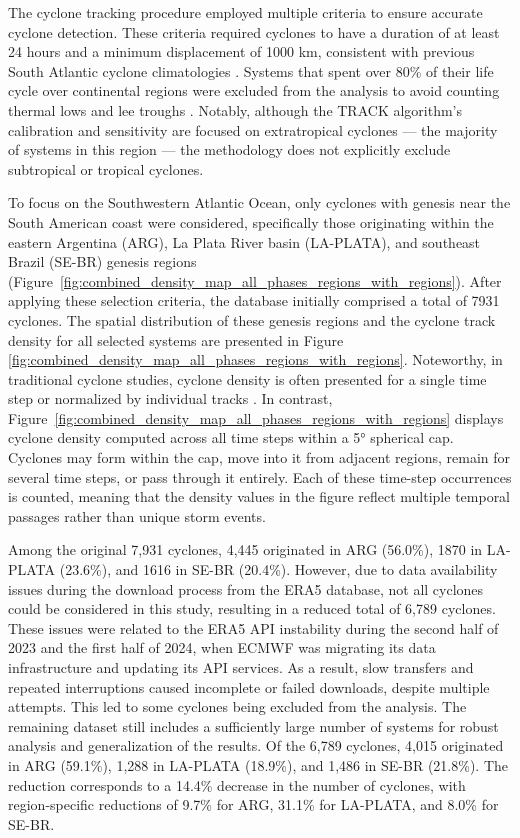 \documentclass[pdflatex,sn-chicago]{sn-jnl}%
\theoremstyle{plain}
\theoremstyle{definition}
\theoremstyle{remark}
\theoremstyle{definition}
\begin{document}
The cyclone tracking procedure employed multiple criteria to ensure accurate cyclone detection. These criteria required cyclones to have a duration of at least 24 hours and a minimum displacement of 1000 km, consistent with previous South Atlantic cyclone climatologies \citep{sinclair1995climatology,gramcianinov2019properties}. Systems that spent over 80\% of their life cycle over continental regions were excluded from the analysis to avoid counting thermal lows and lee troughs \citep[e.g.][]{crespo2021potential}. Notably, although the TRACK algorithm's calibration and sensitivity are focused on extratropical cyclones — the majority of systems in this region \citep{marrafon2022classificaccao} — the methodology does not explicitly exclude subtropical or tropical cyclones.  

To focus on the Southwestern Atlantic Ocean, only cyclones with genesis near the South American coast were considered, specifically those originating within the eastern Argentina (ARG), La Plata River basin (LA-PLATA), and southeast Brazil (SE-BR) genesis regions \citep{gramcianinov2019properties,couto2024new} (Figure~\ref{fig:combined_density_map_all_phases_regions_with_regions}). After applying these selection criteria, the database initially comprised a total of 7931 cyclones. The spatial distribution of these genesis regions and the cyclone track density for all selected systems are presented in Figure \ref{fig:combined_density_map_all_phases_regions_with_regions}. Noteworthy, in traditional cyclone studies, cyclone density is often presented for a single time step or normalized by individual tracks \citep[e.g.,][]{hoskins2005new,gramcianinov2019properties}. In contrast, Figure~\ref{fig:combined_density_map_all_phases_regions_with_regions} displays cyclone density computed across all time steps within a 5° spherical cap. Cyclones may form within the cap, move into it from adjacent regions, remain for several time steps, or pass through it entirely. Each of these time-step occurrences is counted, meaning that the density values in the figure reflect multiple temporal passages rather than unique storm events.

Among the original 7,931 cyclones, 4,445 originated in ARG (56.0\%), 1870 in LA-PLATA (23.6\%), and 1616 in SE-BR (20.4\%). However, due to data availability issues during the download process from the ERA5 database, not all cyclones could be considered in this study, resulting in a reduced total of 6,789 cyclones. These issues were related to the ERA5 API instability during the second half of 2023 and the first half of 2024, when ECMWF was migrating its data infrastructure and updating its API services. As a result, slow transfers and repeated interruptions caused incomplete or failed downloads, despite multiple attempts. This led to some cyclones being excluded from the analysis. The remaining dataset still includes a sufficiently large number of systems for robust analysis and generalization of the results. Of the 6,789 cyclones, 4,015 originated in ARG (59.1\%), 1,288 in LA-PLATA (18.9\%), and 1,486 in SE-BR (21.8\%). The reduction corresponds to a 14.4\% decrease in the number of cyclones, with region-specific reductions of 9.7\% for ARG, 31.1\% for LA-PLATA, and 8.0\% for SE-BR.
\end{document}
